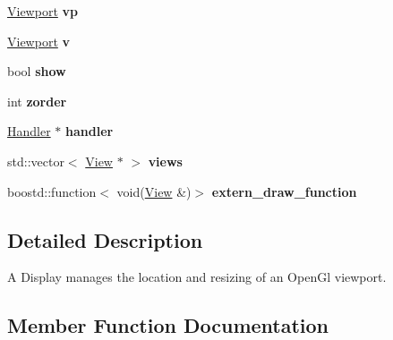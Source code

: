 \begin{DoxyCompactItemize}
\item 
\hyperlink{structpangolin_1_1_viewport}{Viewport} {\bfseries vp}\hypertarget{structpangolin_1_1_view_a4544c2d2ec0de2f1285f987bfad1d135}{}\label{structpangolin_1_1_view_a4544c2d2ec0de2f1285f987bfad1d135}

\item 
\hyperlink{structpangolin_1_1_viewport}{Viewport} {\bfseries v}\hypertarget{structpangolin_1_1_view_a8609b65ce966e466a895031997d14391}{}\label{structpangolin_1_1_view_a8609b65ce966e466a895031997d14391}

\item 
bool {\bfseries show}\hypertarget{structpangolin_1_1_view_a4df9df76234b7adef42227b91139cd9b}{}\label{structpangolin_1_1_view_a4df9df76234b7adef42227b91139cd9b}

\item 
int {\bfseries zorder}\hypertarget{structpangolin_1_1_view_a75bf00aeedbdfea5f6af40bd593692d5}{}\label{structpangolin_1_1_view_a75bf00aeedbdfea5f6af40bd593692d5}

\item 
\hyperlink{structpangolin_1_1_handler}{Handler} $\ast$ {\bfseries handler}\hypertarget{structpangolin_1_1_view_a2c64390bdae6a01e80cba175cd1293ad}{}\label{structpangolin_1_1_view_a2c64390bdae6a01e80cba175cd1293ad}

\item 
std\+::vector$<$ \hyperlink{structpangolin_1_1_view}{View} $\ast$ $>$ {\bfseries views}\hypertarget{structpangolin_1_1_view_aba695a4d88f495e746413a2f9003cae2}{}\label{structpangolin_1_1_view_aba695a4d88f495e746413a2f9003cae2}

\item 
boostd\+::function$<$ void(\hyperlink{structpangolin_1_1_view}{View} \&)$>$ {\bfseries extern\+\_\+draw\+\_\+function}\hypertarget{structpangolin_1_1_view_a9d1bb12c58dcc6ebded4ab3e676f88ba}{}\label{structpangolin_1_1_view_a9d1bb12c58dcc6ebded4ab3e676f88ba}

\end{DoxyCompactItemize}


\subsection{Detailed Description}
A Display manages the location and resizing of an Open\+Gl viewport. 

\subsection{Member Function Documentation}

